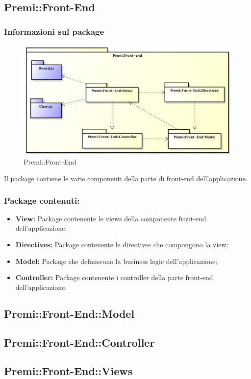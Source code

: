 \subsection{Premi::Front-End}
	\subsubsection*{Informazioni sul package}
		\begin{figure}[h]
			\centering
			\includegraphics[width=\linewidth]{img/front-end_package}
			\caption[Premi::Front-End]{Premi::Front-End}
		\end{figure}
		Il package contiene le varie componenti della parte di \gls{front-end} dell'applicazione.

		\subsubsection*{Package contenuti:}
			\begin{itemize}
				\item \textbf{View:} Package contenente le views della componente \gls{front-end} dell'applicazione;
				\item \textbf{Directives:} Package contenente le directives che compongono la view;
				\item \textbf{Model:} Package che definiscono la \gls{business} logic dell'applicazione;
				\item \textbf{Controller:} Package contenente i controller della parte \gls{front-end} dell'applicazione.
			\end{itemize}

		\subsection{Premi::Front-End::Model}
			
			\newpage

		\subsection{Premi::Front-End::Controller}
			
			\newpage

		\subsection{Premi::Front-End::Views}
			
			\newpage
